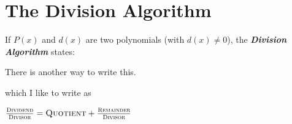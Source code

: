 \section{The Division Algorithm}

If $P(x)$ and $d(x)$ are two polynomials (with $d(x) \ne 0$),
the {\bfseries\itshape Division Algorithm} states:

\myCenteredBox[width=3.5in,valign=center]{
    \Large
    \vspace{-\baselineskip}
    \[ P(x) = Q(x) \,\, d(x) + R(x) \]
}

There is another way to write this.

\myCenteredBox[width=3.5in,valign=center]{
    \Large
    \[ \frac{P(x)}{d(x)} = Q(x) + \frac{R(x)}{d(x)} \]
}

which I like to write as 

{
    \LARGE
    \begin{center}
    $ 
    \frac{\text{\scshape Dividend\rule[-0.2em]{0em}{0.2em}}}{\text{\scshape Divisor\rule{0em}{0.75em}}} 
    =
    \text{\scshape Quotient} 
        + 
        \frac{\text{\scshape Remainder\rule[-0.2em]{0em}{0.2em}}}{\text{\scshape Divisor\rule{0em}{0.75em}}} 
    $
    \end{center}
}



